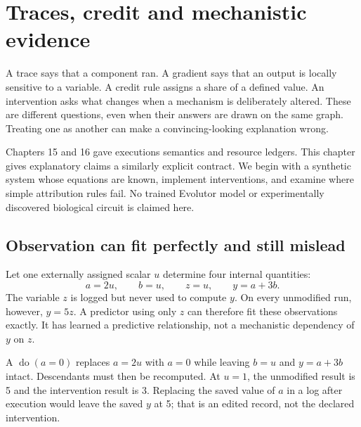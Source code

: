 \chapter{Traces, credit and mechanistic evidence}
A trace says that a component ran. A gradient says that an output is locally
sensitive to a variable. A credit rule assigns a share of a defined value.
An intervention asks what changes when a mechanism is deliberately altered.
These are different questions, even when their answers are drawn on the same
graph. Treating one as another can make a convincing-looking explanation wrong.

Chapters 15 and 16 gave executions semantics and resource ledgers. This
chapter gives explanatory claims a similarly explicit contract. We begin
with a synthetic system whose equations are known, implement interventions,
and examine where simple attribution rules fail. No trained Evolutor model
or experimentally discovered biological circuit is claimed here.

\section{Observation can fit perfectly and still mislead}
Let one externally assigned scalar $u$ determine four internal quantities:
\begin{equation}
 a=2u,\qquad b=u,\qquad z=u,\qquad y=a+3b.
 \label{eq:scm}
\end{equation}
The variable $z$ is logged but never used to compute $y$. On every unmodified
run, however, $y=5z$. A predictor using only $z$ can therefore fit these
observations exactly. It has learned a predictive relationship, not a
mechanistic dependency of $y$ on $z$.


A  $\operatorname{do}(a=0)$ replaces $a=2u$
with $a=0$ while leaving $b=u$ and $y=a+3b$ intact. Descendants must then
be recomputed. At $u=1$, the unmodified result is 5 and the intervention
result is 3. Replacing the saved value of $a$ in a log after execution would
leave the saved $y$ at 5; that is an edited record, not the declared intervention.


